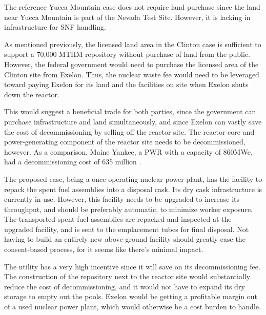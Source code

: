   The reference Yucca Mountain case does not require land purchase 
  since the land near Yucca Mountain is part of the Nevada Test Site. However, 
  it is lacking in infrastructure for \gls{SNF} handling.
  
  As mentioned previously, the licensed land area in the Clinton case is 
  sufficient to support a 70,000 \gls{MTHM} repository without purchase of land from 
  the public.  However, the federal government would need to purchase the 
  licensed area of the Clinton site from Exelon. Thus, the nuclear waste fee 
  would need to be leveraged toward paying Exelon for its land and the 
  facilities on site when Exelon shuts down the reactor.

  This would suggest a beneficial trade for both parties, since the government
  can purchase infrastructure and land simultaneously, and since Exelon can vastly
  save the cost of decommissioning by selling off the reactor site. The reactor
  core and power-generating component of the reactor site needs to be decommissioned,
  however. As a comparison, Maine Yankee, a \gls{PWR} with a capacity of 860MWe, had a
  decommissioning cost of 635 million \cite{aker_maine_2004}.





The proposed case, being a once-operating nuclear power plant, has the facility to 
repack the spent fuel assemblies into a disposal cask. Its dry cask infrastructure 
is currently in use. However, this facility needs to be upgraded to increase its throughput, and should be preferably automatic, to minimize worker exposure. The transported spent fuel assemblies are repacked and inspected at the upgraded facility, and is sent to the emplacement tubes for final disposal. Not having to build an entirely new above-ground facility should greatly ease the consent-based process, for it seems like there's minimal impact. 
 
The utility has a very high incentive since it will save on its decommissioning fee.
The construction of the repository next to the reactor site would substantially
reduce the cost of decommissioning, and it would not have to expand its dry storage
to empty out the pools. Exelon would be getting a profitable margin out of a
used nuclear power plant, which would otherwise be a cost burden to handle.

